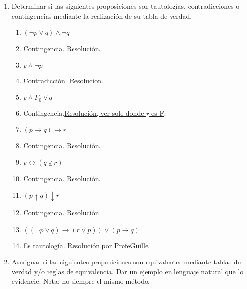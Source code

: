 \documentclass[a4paper]{article}
\newcommand{\answer}{\item[**]}
\newcommand{\exercise}{\item}
\newcommand{\then}{\to}
\newcommand{\eq}{\leftrightarrow}
\newcommand{\xor}{\veebar}
\newcommand{\nor}{\downarrow}
\newcommand{\nand}{\uparrow}
\begin{document}
\begin{enumerate}
\begin{multicols}{2}
\begin{enumerate} [label=(\alph*)]
		\item Si te tomás el 324 te deja cerca de la UNQ, si te tomás el 65 no. 
		\answer $( p\then q ) \land ( r\then \neg q )$ con $p$:"\textit{Te tomas el 324}", $q$:"\textit{Te deja cerca de la UNQ}" y $p$:"\textit{Te tomás el 65}".  

	\end{enumerate}
	\end{multicols}


	\exercise Determinar si las siguientes proposiciones son tautologías, contradicciones o contingencias mediante la realización de su tabla de verdad. 
	\begin{multicols}{2}
	\begin{enumerate} [label=(\alph*)]
		\item $(\neg p \lor  q) \land  \neg q$
		\answer Contingencia. \href{https://www.wolframalpha.com/input?i=%28not+p+or+q%29+and+not+q}{Resolución}.

		\item $p \land  \neg p$
		\answer Contradicción. \href{https://www.wolframalpha.com/input?i=truth+table+of%3A+p+and+not+p}{Resolución}.

		\item $p \land  F_0 \lor  q$
		\answer Contingencia.\href{https://www.wolframalpha.com/input?i=p+and+r+or++q}{Resolución, ver solo donde $r$ es F}.

		\item $(p \then  q) \then  r$
		\answer Contingencia. \href{https://www.wolframalpha.com/input?i=%28p+%3D%3E+q%29+%3D%3E+r}{Resolución}.

		\item $p \eq (q \xor  r)$
		\answer Contingencia. \href{https://www.wolframalpha.com/input?i=p+%3C%3D%3E+%28q+xor++r%29}{Resolución}.

		\item $(p \nand q) \nor r$
		\answer Contingencia. \href{https://www.wolframalpha.com/input?i=%28p+nand+q%29+nor+r}{Resolución}

		\item $((\neg p \lor q) \then (r \lor p)) \lor (p \then q)$
		\answer Es tautología. \href{https://youtu.be/k-amMQR3oMc}{Resolución por ProfeGuille}.

	\end{enumerate}
	\end{multicols}

	\exercise Averiguar si las siguientes proposiciones son equivalentes mediante tablas de verdad y/o reglas de equivalencia.  Dar un ejemplo en lenguaje natural que lo evidencie. Nota: no siempre el mismo método.
	\begin{multicols}{2}
	\begin{enumerate} [label=(\alph*)]


\end{enumerate}
\end{multicols}
\end{enumerate}
\end{document}
